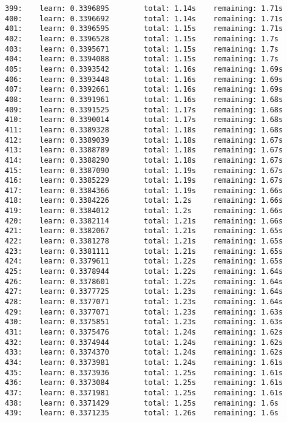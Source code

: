 \documentclass[11pt]{article}
\begin{document}
\begin{Verbatim}[commandchars=\\\{\}]
399:    learn: 0.3396895        total: 1.14s    remaining: 1.71s
400:    learn: 0.3396692        total: 1.14s    remaining: 1.71s
401:    learn: 0.3396595        total: 1.15s    remaining: 1.71s
402:    learn: 0.3396528        total: 1.15s    remaining: 1.7s
403:    learn: 0.3395671        total: 1.15s    remaining: 1.7s
404:    learn: 0.3394088        total: 1.15s    remaining: 1.7s
405:    learn: 0.3393542        total: 1.16s    remaining: 1.69s
406:    learn: 0.3393448        total: 1.16s    remaining: 1.69s
407:    learn: 0.3392661        total: 1.16s    remaining: 1.69s
408:    learn: 0.3391961        total: 1.16s    remaining: 1.68s
409:    learn: 0.3391525        total: 1.17s    remaining: 1.68s
410:    learn: 0.3390014        total: 1.17s    remaining: 1.68s
411:    learn: 0.3389328        total: 1.18s    remaining: 1.68s
412:    learn: 0.3389039        total: 1.18s    remaining: 1.67s
413:    learn: 0.3388789        total: 1.18s    remaining: 1.67s
414:    learn: 0.3388290        total: 1.18s    remaining: 1.67s
415:    learn: 0.3387090        total: 1.19s    remaining: 1.67s
416:    learn: 0.3385229        total: 1.19s    remaining: 1.67s
417:    learn: 0.3384366        total: 1.19s    remaining: 1.66s
418:    learn: 0.3384226        total: 1.2s     remaining: 1.66s
419:    learn: 0.3384012        total: 1.2s     remaining: 1.66s
420:    learn: 0.3382114        total: 1.21s    remaining: 1.66s
421:    learn: 0.3382067        total: 1.21s    remaining: 1.65s
422:    learn: 0.3381278        total: 1.21s    remaining: 1.65s
423:    learn: 0.3381111        total: 1.21s    remaining: 1.65s
424:    learn: 0.3379611        total: 1.22s    remaining: 1.65s
425:    learn: 0.3378944        total: 1.22s    remaining: 1.64s
426:    learn: 0.3378601        total: 1.22s    remaining: 1.64s
427:    learn: 0.3377725        total: 1.23s    remaining: 1.64s
428:    learn: 0.3377071        total: 1.23s    remaining: 1.64s
429:    learn: 0.3377071        total: 1.23s    remaining: 1.63s
430:    learn: 0.3375851        total: 1.23s    remaining: 1.63s
431:    learn: 0.3375476        total: 1.24s    remaining: 1.62s
432:    learn: 0.3374944        total: 1.24s    remaining: 1.62s
433:    learn: 0.3374370        total: 1.24s    remaining: 1.62s
434:    learn: 0.3373981        total: 1.24s    remaining: 1.61s
435:    learn: 0.3373936        total: 1.25s    remaining: 1.61s
436:    learn: 0.3373084        total: 1.25s    remaining: 1.61s
437:    learn: 0.3371981        total: 1.25s    remaining: 1.61s
438:    learn: 0.3371429        total: 1.25s    remaining: 1.6s
439:    learn: 0.3371235        total: 1.26s    remaining: 1.6s

\end{Verbatim}
\end{document}
